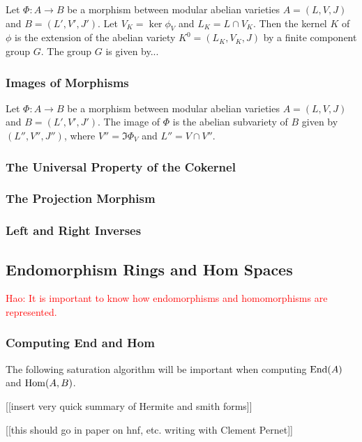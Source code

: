 \documentclass{article}
\newcommand{\Haonew}[1]{\textcolor{red}{\textsf{Hao: #1}}}
\begin{document}
Let $\Phi:A\to B$ be a morphism between modular abelian varieties $A=(L, V, J)$
and $B=(L', V', J')$. Let $V_K=\ker \phi_V$ and $L_K=L\cap V_K$. Then the
kernel $K$ of $\phi$ is the extension of the abelian variety $K^0 = (L_K, V_K,
J)$ by a finite component group $G$. The group $G$ is given by...

\subsubsection{Images of Morphisms}

Let $\Phi:A\to B$ be a morphism between modular abelian varieties $A=(L, V, J)$
and $B=(L', V', J')$. The image of $\Phi$ is the abelian subvariety of $B$
given by $(L'', V'', J'')$, where $V''=\Im \Phi_V$ and $L''=V\cap V''$.

\subsubsection{The Universal Property of the Cokernel}

\subsubsection{The Projection Morphism} 

\subsubsection{Left and Right Inverses}

\subsection{Endomorphism Rings and Hom Spaces}

\Haonew{It is important to know how endomorphisms
and homomorphisms are represented.}

\subsubsection{Computing End and Hom}

The following saturation algorithm will be important
when computing $\operatorname{End}(A)$ and $\operatorname{Hom}(A,B)$.

[[insert very quick summary of Hermite and smith forms]]

[[this should go in paper on hnf, etc. writing with
Clement Pernet]]
\end{document}
